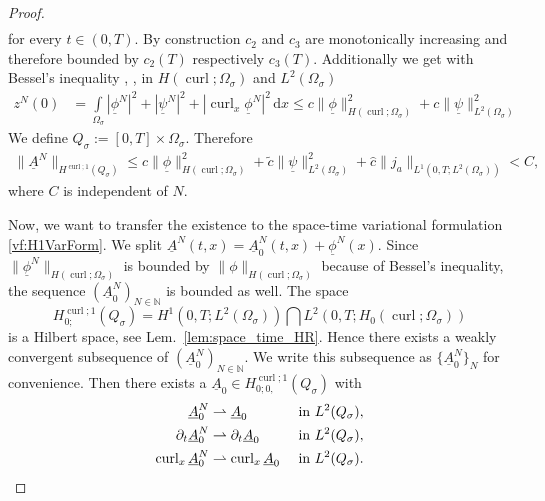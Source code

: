 \documentclass[a4paper,11pt]{article}
\newcommand{\N}{\mathbb N}
\newcommand{\omsig}{\Omega_{\sigma}}
\newcommand{\cu}{\operatorname{curl}}
\renewcommand{\vec}[1]{\underline{#1}}
\newcommand{\abs}[1]{\left\lvert{#1}\right\rvert}
\begin{document}
\begin{proof}
\begin{align*}
	\end{align*}
	for every $t\in(0,T)$.
	By construction  $c_2$ and $c_3$ are monotonically increasing and therefore bounded by $c_2(T)$ respectively $c_3(T)$. Additionally we get with Bessel's inequality , \cite[Thm. 1.7.1]{aubin}, in $H(\cu;\omsig)$ and $L^2(\Omega_\sigma)$
	\begin{align*}
		z^N(0) &= \int\limits_{\omsig}\abs{\vec \phi^{N}}^2+\abs{\vec \psi^N}^2 +\abs{\cu_x \vec \phi^N}^2\,\mathrm dx\leq c\|\vec \phi\|^2_{H(\cu;\omsig)} + c \|\vec \psi\|^2_{L^2(\omsig)}
	\end{align*}
	We define $Q_\sigma := [0,T]\times \omsig$. Therefore
	\begin{align*}
		\|\vec A^N\|_{H^{\cu;1}(Q_\sigma)} \leq c\|\vec \phi\|^2_{H(\cu;\omsig)}+ \tilde{c}\|\vec \psi\|^2_{L^2(\omsig)} +\hat{c} \|j_a\|_{L^1(0,T;L^2(\omsig))} < C,
	\end{align*}
	where $C$ is independent of $N$.  
	
	Now, we want to transfer the existence to the space-time variational formulation \eqref{vf:H1VarForm}.  We split $\vec A^N(t,x)=\vec A_0^N(t,x)+\vec \phi^N(x)$. Since $\|\vec \phi^N\|_{H(\cu;\omsig)}$ is bounded by $\|\phi\|_{H(\cu;\omsig)}$ because of Bessel's inequality, the sequence $(\vec A_0^N)_{N\in\N}$ is bounded as well. The space \[H^{\cu;1}_{0;}(Q_\sigma) = H^1(0,T;L^2(\omsig))\bigcap L^2(0,T;H_0(\cu;\omsig))\]
	is a Hilbert space, see Lem.~\ref{lem:space_time_HR}. Hence there exists a weakly convergent subsequence of $(\vec A_0^N)_{N\in\N}$. We write this subsequence as  $\{\vec A_0^N \}_N$ for convenience. Then there exists a $\vec A_0\in H^{\cu;1}_{0;0,}(Q_\sigma)$ with
	\begin{align*}
		\vec A_0^N&\rightharpoonup \vec A_0 &&\textmd{ in }L^2(Q_\sigma),\\
		\partial_t \vec  A_0^N &\rightharpoonup \partial_t \vec A_0 &&\textmd{ in }L^2(Q_\sigma),\\
		\cu_x  \vec  A_0^N &\rightharpoonup \cu_x  \vec A_0 &&\textmd{ in }L^2(Q_\sigma).
	\end{align*}
	

\end{proof}
\end{document}
